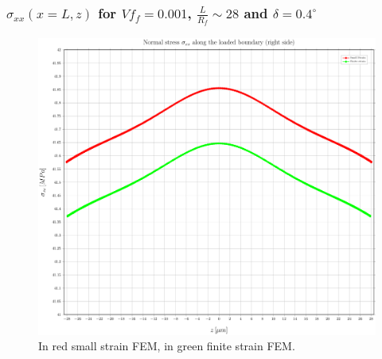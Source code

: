 \documentclass[first,firstsupp,lastsupp,handout,last,hyperref,table]{ETHclass}
\begin{document}
\begin{frame}
\frametitle{\small $\sigma_{xx}\left(x=L,z\right)$ for $Vf_{f}=0.001$, $\frac{L}{R_{f}}\sim28$ and $\delta=0.4^{\circ}$}
\vspace{-0.5cm}
\centering
\captionsetup[figure]{font=scriptsize,labelfont=scriptsize}
\begin{figure}[!h]
\centering
\includegraphics[height=0.7\textheight]{2017-06-23_AbqRunSummary_SingleFiberEqRfFiniteStrain_sigmaatboundary_Summary.pdf}
  \caption{\scriptsize In red small strain FEM, in green finite strain FEM.}
  \label{fig:res1}
\end{figure}
\end{frame}
\end{document}
